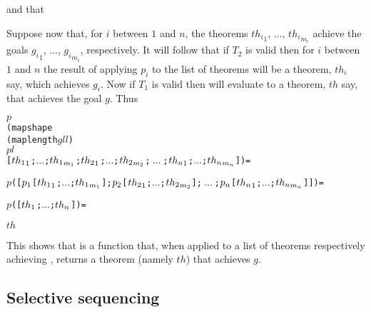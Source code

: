 \bigskip


\bigskip

\noindent and that

\bigskip


\bigskip

Suppose now that, for $i$ between $1$ and $n$, the theorems
${th_i}_1$, $\dots$, ${th_i}_{m_i}$ achieve
the goals ${g_i}_1$, $\dots$, ${g_i}_{m_i}$, respectively.
It will follow that if $T_2$ is valid
then for $i$ between $1$ and $n$
the result of applying $p_i$ to the list of
theorems \ml{[${th_i}_1$;$\ldots$;${th_i}_{m_i}$]}
will be a theorem, $th_i$ say, which achieves
$g_i$.
Now if $T_1$ is valid then 
will evaluate to a theorem,
$th$ say,
that achieves the goal $g$. Thus

\begin{hol}
\begin{alltt}
    \(p\)
    (mapshape
     (map length \(gll\))
     \(pl\)
     [\({th\sb{1}}\sb{1}\);\(\ldots\);\({th\sb{1}}\sb{m\sb{1}}\);\({th\sb{2}}\sb{1}\);\(\ldots\);\({th\sb{2}}\sb{m\sb{2}}\);\(\ \ldots\ \) ;\({th\sb{n}}\sb{1}\);\(\ldots\);\({th\sb{n}}\sb{m\sb{n}}\)]) =

    \(p\)([\(p\sb{1}\)[\({th\sb{1}}\sb{1}\);\(\ldots\);\({th\sb{1}}\sb{m\sb{1}}\)];\(p\sb{2}\)[\({th\sb{2}}\sb{1}\);\(\ldots\);\({th\sb{2}}\sb{m\sb{2}}\)];\(\ \ldots\ \);\(p\sb{n}\)[\({th\sb{n}}\sb{1}\);\(\ldots\);\({th\sb{n}}\sb{m\sb{n}}\)]]) =

    \(p\)([\(th\sb{1}\);\(\ldots\);\(th\sb{n}\)]) =

    \(th\)
\end{alltt}
\end{hol}

This shows that
is a function that, when
applied to a list of theorems respectively
achieving , returns a theorem
(namely $th$) that achieves $g$.

\subsection{Selective sequencing}

